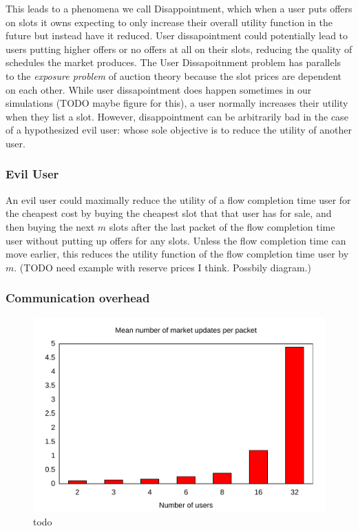 This leads to a phenomena we call Disappointment, which when a user puts offers on slots it owns expecting to only increase their overall utility function in the future but instead have it reduced. User dissapointment could potentially lead to users putting higher offers or no offers at all on their slots, reducing the quality of schedules the market produces.
The User Dissapoitnment problem has parallels to the \emph{exposure problem} of auction theory \cite{milgrom00, englmaier06} because the slot prices are dependent on each other.
While user dissapointment does happen sometimes in our simulations (TODO maybe figure for this), a user normally increases their utility when they list a slot.
However, disappointment can be arbitrarily bad in the case of a hypothesized evil user: whose sole objective is to reduce the utility of another user.
\subsubsection{Evil User}
An evil user could maximally reduce the utility of a flow completion time user for the cheapest cost by buying the cheapest slot that that user has for sale, and then buying the next $m$ slots after the last packet of the flow completion time user without putting up offers for any slots. Unless the flow completion time can move earlier, this reduces the utility function of the flow completion time user by $m$. (TODO need example with reserve prices I think. Possbily diagram.)

\subsubsection{Communication overhead}

\begin{figure}
\includegraphics[width=\columnwidth]{plots/num_market_updates.pdf}
\caption{todo}
\label{f:num_market_updates}
\end{figure}

